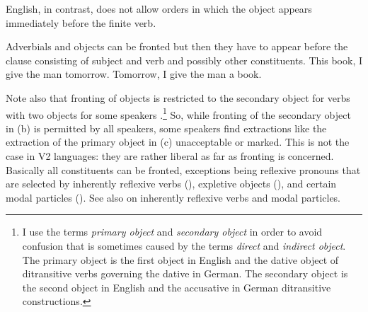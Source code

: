English, in contrast, does not allow orders in which the object appears immediately before the
finite verb.

\eal
{}
\zl 
Adverbials and objects can be fronted but then they have to appear before the clause consisting of
subject and verb and possibly other constituents.
\eal
\ex This book, I give the man tomorrow. 
\ex Tomorrow, I give the man a book.
\zl

Note also that fronting of objects is restricted to the secondary object for verbs with two objects
for some speakers \citep[]{Hudson92a-u}.\footnote{
  I use the terms \emph{primary object} and \emph{secondary object} in order to avoid confusion that is sometimes
  caused by the terms \emph{direct} and \emph{indirect object}. The primary object is the first object in English
  and the dative object of ditransitive verbs governing the dative in German. The secondary object
  is the second object in English and the accusative in German ditransitive constructions.
} So, while fronting of the secondary object in
(b) is permitted by all speakers, some speakers find extractions like the extraction of the
primary object in (c) unacceptable or marked.
\vspace{-\baselineskip}
\eal
\judgewidth{\%}
\zl
This is not the case in V2 languages: they are rather liberal as far as fronting
is concerned. Basically all constituents can be fronted, exceptions being reflexive
pronouns that are selected by inherently reflexive verbs (), expletive objects (), and certain modal
particles (). See also  on inherently reflexive verbs and modal particles.
\eal
{}
\zl
\eal
{}
\zl
\eal
{}
\zl

